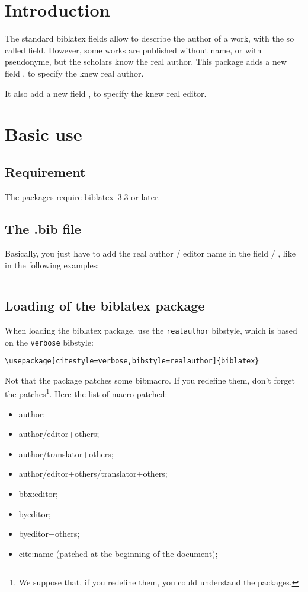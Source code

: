 \documentclass{ltxdockit}[2011/03/25]
\newcommand{\biblatex}{biblatex\xspace}
\newcommand{\namebibstyle}[1]{\texttt{#1}}
\begin{document}
\printtitlepage
\tableofcontents
\section{Introduction}

The standard biblatex fields allow to describe the author of a work, with the so called  field. However, some works are published without name, or with pseudonyme, but the scholars know the real author. This package adds a new field , to specify the knew real author.

It also add a new field , to specify the knew real editor.

\section{Basic use}

\subsection{Requirement}

The packages require \biblatex~3.3 or later.

\subsection{The .bib file}
Basically, you just have to add the real author / editor name in the field  / , like in the following examples: 

\inputminted{tex}{example-realauthor.bib}

\subsection{Loading of the \biblatex package}

When loading the \biblatex package, use the \namebibstyle{realauthor}  bibstyle, which is based on the \namebibstyle{verbose} bibstyle:

\begin{verbatim}
\usepackage[citestyle=verbose,bibstyle=realauthor]{biblatex}
\end{verbatim}

Not that the package patches some bibmacro.
If you redefine them, don't forget the patches\footnote{We suppose that, if you redefine them, you could understand the packages.}.
Here the list of macro patched:
\begin{itemize}
  \item author;
  \item author/editor+others;
  \item author/translator+others;
  \item author/editor+others/translator+others;
  \item bbx:editor;
  \item byeditor;
  \item byeditor+others;
  \item cite:name (patched at the beginning of the document);
\end{itemize}
\end{document}

